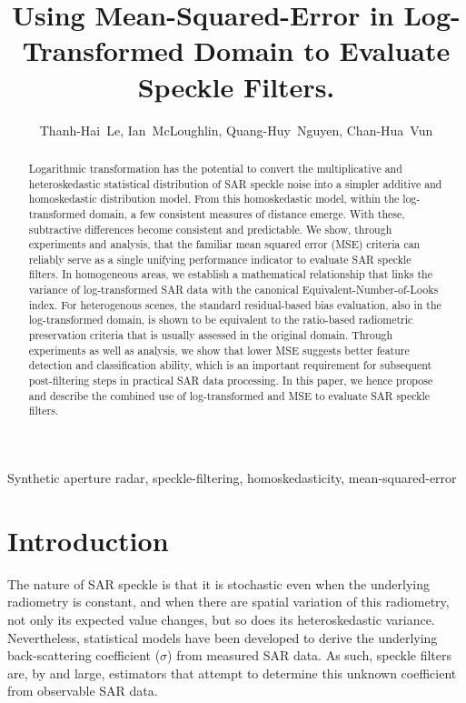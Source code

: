 \documentclass[journal]{IEEEtran}
\title{ 
	Using Mean-Squared-Error in Log-Transformed Domain to Evaluate Speckle Filters.
}
\author{Thanh-Hai~Le,
        Ian~McLoughlin, 
	    Quang-Huy~Nguyen,
	    Chan-Hua~Vun%
}
\begin{document}
\maketitle

\begin{abstract}

Logarithmic transformation has the potential to convert 
	the multiplicative and heteroskedastic statistical distribution of SAR speckle noise into 
	a simpler additive and homoskedastic distribution model.
From this homoskedastic model, within the log-transformed domain, 
	a few consistent measures of distance emerge.
With these, subtractive differences become consistent and predictable. 
We show, through experiments and analysis, that 
	the familiar mean squared error (MSE) criteria can reliably serve 
	as a single unifying performance indicator to evaluate SAR speckle filters. 
In homogeneous areas, we establish a mathematical relationship that links the variance of 
	log-transformed SAR data with the canonical Equivalent-Number-of-Looks index.
For heterogenous scenes, the standard residual-based bias evaluation, also in the log-transformed domain, 
	is shown to be equivalent to the ratio-based radiometric preservation criteria that is usually assessed in the 
	original domain. 
Through experiments as well as analysis, we show that lower MSE suggests better feature detection and classification
	ability, which is an important requirement for subsequent post-filtering steps in practical SAR data processing.
In this paper, we hence propose and describe the combined use of log-transformed and MSE to evaluate SAR speckle 
	filters.

\end{abstract}

\begin{IEEEkeywords}
Synthetic aperture radar, speckle-filtering, homoskedasticity, mean-squared-error
\end{IEEEkeywords}

\IEEEpeerreviewmaketitle

\section{Introduction}

The nature of SAR speckle is that
	it is stochastic even when the underlying radiometry is constant, 
	and when there are spatial variation of this radiometry, not only its expected value changes, but so does its heteroskedastic variance.
Nevertheless, statistical models have been developed to derive the underlying back-scattering coefficient ($\sigma$) from measured SAR data. 
As such, speckle filters are, by and large, estimators that attempt to determine this unknown coefficient from observable SAR data. 
\end{document}

